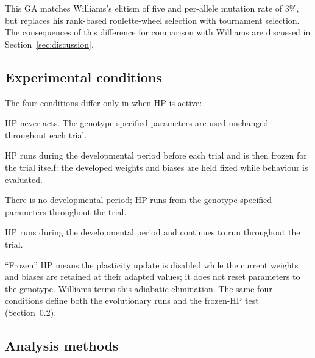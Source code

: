 This GA matches Williams's elitism of five and per-allele mutation rate of $3\%$,
but replaces his rank-based roulette-wheel selection with tournament selection.
The consequences of this difference for comparison with Williams are discussed in
Section~\ref{sec:discussion}.


\subsection{Experimental conditions}
\label{sec:methods:conditions}

The four conditions differ only in when HP is active:
%
\begin{description}[leftmargin=2em, itemsep=2pt]
  \item[No HP.] HP never acts. The genotype-specified parameters are used
    unchanged throughout each trial.
  \item[Dev only.] HP runs during the developmental period before each trial
    and is then frozen for the trial itself: the developed weights and biases
    are held fixed while behaviour is evaluated.
  \item[Behaviour only.] There is no developmental period; HP runs from the
    genotype-specified parameters throughout the trial.
  \item[Both.] HP runs during the developmental period and continues to run
    throughout the trial.
\end{description}
%
``Frozen'' HP means the plasticity update is disabled while the current weights
and biases are retained at their adapted values; it does not reset parameters to
the genotype. Williams terms this adiabatic elimination. The same four
conditions define both the evolutionary runs and the frozen-HP test
(Section~\ref{sec:methods:analysis}).

\subsection{Analysis methods}
\label{sec:methods:analysis}

